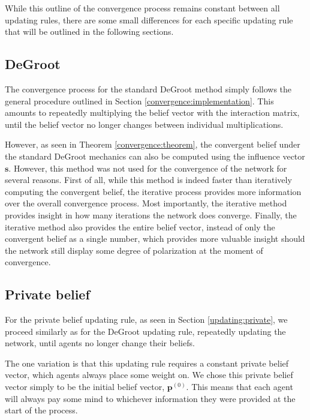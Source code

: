 \documentclass[a4paper, 12pt]{report}
\begin{document}
While this outline of the convergence process remains constant between all updating rules, there are some small differences for each specific updating rule that will be outlined in the following sections.

\subsection{DeGroot}
\label{implementation:degroot}
The convergence process for the standard DeGroot method simply follows the general procedure outlined in Section \ref{convergence:implementation}. This amounts to repeatedly multiplying the belief vector with the interaction matrix, until the belief vector no longer changes between individual multiplications. 

However, as seen in Theorem \ref{convergence:theorem}, the convergent belief under the standard DeGroot mechanics can also be computed using the influence vector $\bm{s}$. However, this method was not used for the convergence of the network for several reasons. First of all, while this method is indeed faster than iteratively computing the convergent belief, the iterative process provides more information over the overall convergence process. Most importantly, the iterative method provides insight in how many iterations the network does converge. Finally, the iterative method also provides the entire belief vector, instead of only the convergent belief as a single number, which provides more valuable insight should the network still display some degree of polarization at the moment of convergence.

\subsection{Private belief}
\label{implementation:private}
For the private belief updating rule, as seen in Section \ref{updating:private}, we proceed similarly as for the DeGroot updating rule, repeatedly updating the network, until agents no longer change their beliefs. 

The one variation is that this updating rule requires a constant private belief vector, which agents always place some weight on. We chose this private belief vector simply to be the initial belief vector, $\bm{p}^{(0)}$. This means that each agent will always pay some mind to whichever information they were provided at the start of the process.
\end{document}
